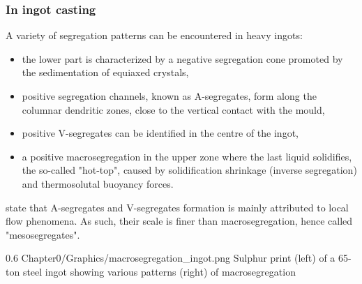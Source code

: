 \subsubsection*{In ingot casting}
A variety of segregation patterns can be encountered in heavy ingots: 
\begin{itemize}
\itemsep0em 
\item the lower part is characterized by a negative segregation cone promoted by the sedimentation of 
	  equiaxed crystals,
\item positive segregation channels, known as A-segregates, form along the columnar dendritic zones, close to the vertical contact with the mould,
\item positive V-segregates can be identified in the centre of the ingot,
\item a positive macrosegregation in the upper zone where the last liquid solidifies, the so-called "hot-top", caused by solidification shrinkage (inverse segregation)
	  and thermosolutal buoyancy forces. 
\end{itemize}
\citet{combeau_prediction_2009} state that A-segregates and V-segregates formation is mainly attributed to local flow phenomena.
As such, their scale is finer than macrosegregation, hence called "mesosegregates".
\begin{figureth}
{0.6}
{Chapter0/Graphics/macrosegregation_ingot.png}
{Sulphur print (left) of a 65-ton steel ingot \citep{lesoult_macrosegregation_2005} showing various patterns (right) of macrosegregation \citep{flemings_solidification_1974}}
\label{macrosegregation_ingot}
\end{figureth}
